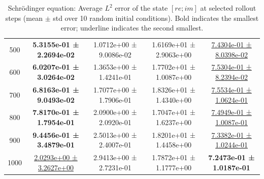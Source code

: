 \documentclass{article}
\theoremstyle{plain}
\theoremstyle{definition}
\theoremstyle{remark}
\begin{document}
\begin{table}[htbp]
\begin{tabular}{ccccc}
500 & \textbf{5.3155e-01 ± 2.2694e-02} & 1.0712e+00 ± 9.0086e-02 & 1.6169e+01 ± 2.9063e+00 & \underline{7.4304e-01 ± 8.0398e-02} \\
600 & \textbf{6.0207e-01 ± 3.0264e-02} & 1.3653e+00 ± 1.4241e-01 & 1.7702e+01 ± 1.0087e+00 & \underline{7.5304e-01 ± 8.2394e-02} \\
700 & \textbf{6.8163e-01 ± 9.0493e-02} & 1.7077e+00 ± 1.7906e-01 & 1.8326e+01 ± 1.4340e+00 & \underline{7.5534e-01 ± 1.0624e-01} \\
800 & \textbf{7.8170e-01 ± 1.7954e-01} & 2.0900e+00 ± 2.0920e-01 & 1.7047e+01 ± 1.6237e+00 & \underline{7.4949e-01 ± 1.0087e-01} \\
900 & \textbf{9.4456e-01 ± 3.4879e-01} & 2.5013e+00 ± 2.4007e-01 & 1.8201e+01 ± 1.4458e+00 & \underline{7.3382e-01 ± 1.0244e-01} \\
1000& \underline{2.0293e+00 ± 3.2627e+00} & 2.9413e+00 ± 2.7231e-01 & 1.7872e+01 ± 1.1777e+00 & \textbf{7.2473e-01 ± 1.0187e-01} \\
\hline
\end{tabular}
\caption{Schr\"odinger equation: Average $L^2$ error of the state $[re;im]$ at selected rollout steps
(mean $\pm$ std over 10 random initial conditions).
Bold indicates the smallest error; underline indicates the second smallest.}
\label{tab:sch-l2_errors_time_rows}
\end{table}
\end{document}
